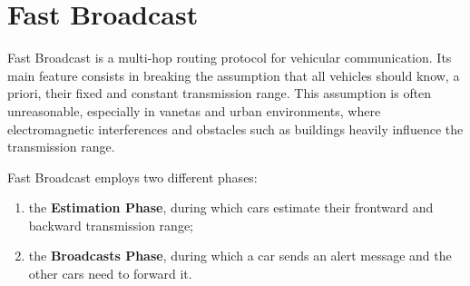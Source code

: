 
\chapter{Fast Broadcast}
	Fast Broadcast \cite{4199282} is a multi-hop routing protocol for vehicular communication. Its main feature consists in breaking the assumption that all vehicles should know, a priori, their fixed and constant transmission range. This assumption is often unreasonable, especially in \acrshort{vaneta}s and urban environments, where electromagnetic interferences and obstacles such as buildings heavily influence the transmission range.
	
	
	Fast Broadcast employs two different phases:
	\begin{enumerate}
		\item the \textbf{Estimation Phase}, during which cars estimate their frontward and backward transmission range;
		\item the \textbf{Broadcasts Phase}, during which a car sends an alert message and the other cars need to forward it.
	\end{enumerate}

